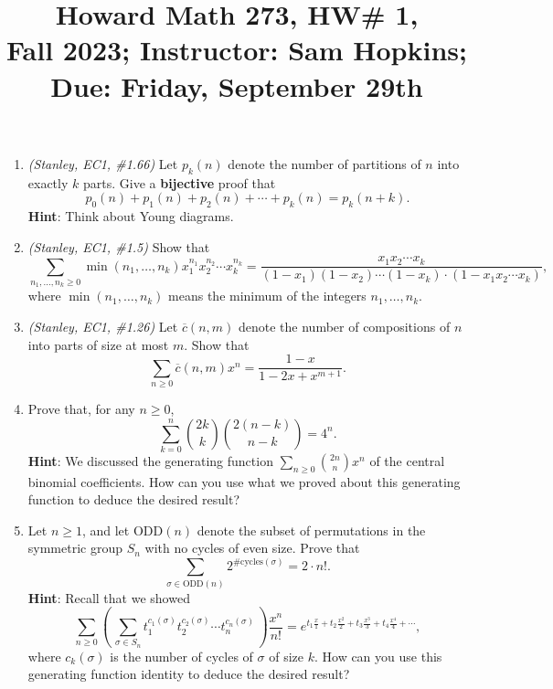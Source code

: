 \documentclass[11pt]{article}
\title{Howard Math 273, HW\# 1, \\ {\normalsize Fall 2023; Instructor: Sam Hopkins; Due: Friday, September 29th}}
\date{}
\begin{document}
\maketitle

\thispagestyle{empty}

\begin{enumerate}

\item \emph{(Stanley, EC1, \#1.66)} Let $p_k(n)$ denote the number of partitions of $n$ into exactly $k$ parts. Give a {\bf bijective} proof that
\[p_0(n)+p_1(n)+p_2(n)+\cdots + p_k(n) = p_k(n+k).\]
{\bf Hint}: Think about Young diagrams.

\item \emph{(Stanley, EC1, \#1.5)} Show that 
\[ \sum_{n_1,\ldots, n_k \geq 0} \min(n_1,\ldots,n_k) x_1^{n_1}x_2^{n_2}\cdots x_k^{n_k} = \frac{x_1x_2\cdots x_k}{(1-x_1)(1-x_2)\cdots(1-x_k) \cdot (1-x_1x_2\cdots x_k)}, \]
where $ \min(n_1,\ldots,n_k)$ means the minimum of the integers $n_1,\ldots,n_k$.

\item \emph{(Stanley, EC1, \#1.26)} Let $\overline{c}(n,m)$ denote the number of compositions of $n$ into parts of size at most $m$. Show that
\[ \sum_{n\geq 0} \overline{c}(n,m)x^n = \frac{1-x}{1-2x+x^{m+1}}.\]

\item Prove that, for any $n \geq 0$,
\[ \sum_{k=0}^{n} \binom{2k}{k}\binom{2(n-k)}{n-k} = 4^n. \]
{\bf Hint}: We discussed the generating function $\sum_{n\geq 0} \binom{2n}{n}x^n$ of the central binomial coefficients. How can you use what we proved about this generating function to deduce the desired result?

\item Let $n \geq 1$, and let $\mathrm{ODD}(n)$ denote the subset of permutations in the symmetric group $S_n$ with no cycles of even size. Prove that
\[ \sum_{\sigma \in \mathrm{ODD}(n)} 2^{\#\mathrm{cycles}(\sigma)} = 2\cdot n!. \]
{\bf Hint}: Recall that we showed
\[ \sum_{n \geq 0}  \left( \, \sum_{\sigma\in S_n} t_1^{c_1(\sigma)} t_2^{c_2(\sigma)} \cdots t_n^{c_n(\sigma)} \, \right)  \frac{x^n}{n!} = e^{t_1 \frac{x}{1} + t_2\frac{x^2}{2} + t_3\frac{x^3}{3} + t_4\frac{x^4}{4} + \cdots},\]
where $c_k(\sigma)$ is the number of cycles of $\sigma$ of size $k$. How can you use this generating function identity to deduce the desired result?


\end{enumerate}
\end{document}

